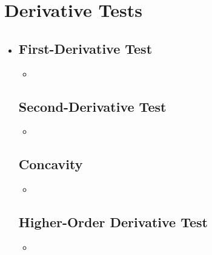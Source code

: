 \section{Derivative Tests}
\begin{itemize}
  \item []

  \subsection{First-Derivative Test}
  \begin{itemize}
    \item 
  \end{itemize}

  \subsection{Second-Derivative Test}
  \begin{itemize}
    \item 
  \end{itemize}

  \subsection{Concavity}
  \begin{itemize}
    \item 
  \end{itemize}

  \subsection{Higher-Order Derivative Test}
  \begin{itemize}
    \item 
  \end{itemize}
    
\end{itemize}
  
